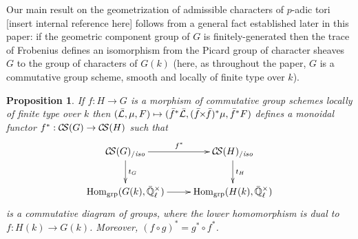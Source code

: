 \documentclass[11pt]{amsart}
\theoremstyle{plain}
\newtheorem{proposition}[theorem]{Proposition}
\theoremstyle{definition}
\theoremstyle{remark}
\newcommand{\EE}{\mathbb{\bar Q}_\ell}
\newcommand{\Fq}{k}
\newcommand{\EEx}{\EE^\times}
\DeclareMathOperator{\Hom}{Hom}
\newcommand{\gcs}[1]{{\mathcal{\bar #1}}}
\newcommand{\CS}{{\mathcal{C\hskip-1.8pt S}}}
\newcommand{\CSiso}[1]{\CS(#1)_{/\textit{iso}}}
\newcommand{\tightertimes}{\hskip-3pt\times\hskip-3pt}
\renewcommand{\bf}{\bar{f}}
\newcommand{\bfxf}{\bar{f} \tightertimes \bar{f}}
\begin{document}
Our main result on the geometrization of admissible characters of
$p$-adic tori [insert internal reference here] follows from a general
fact established later in this paper: if the geometric component group
of $G$ is finitely-generated then the trace of Frobenius defines an
isomorphism from the Picard group of character sheaves $G$ to the
group of characters of $G(\Fq)$ (here, as throughout the paper, $G$ is
a commutative group scheme, smooth and locally of finite type over $\Fq$).


\begin{proposition}\label{prop:pullback}
  If $f : H\to G$ is a morphism of commutative group schemes locally of finite type over $\Fq$ then
  $(\gcs{L},\mu,F) \mapsto (\bf^*\gcs{L},(\bfxf)^*\mu,\bf^*F)$
  defines a monoidal functor $f^* : \CS(G) \to \CS(H)$ such that
  \[
  \xymatrix{
  \CSiso{G} \ar[r]^{f^*} \ar[d]^{t_{G}} &  \ar[d]^{t_{H}} \CSiso{H}\\
  \Hom_\text{grp}(G(\Fq),\EEx) \ar[r] & \Hom_\text{grp}(H(\Fq),\EEx)
  }
  \]
  is a commutative diagram of groups, where the lower homomorphism is
  dual to $f : H(\Fq)\to G(\Fq)$.  Moreover, $(f\circ g)^* = g^* \circ f^*$.
\end{proposition}
\end{document}
